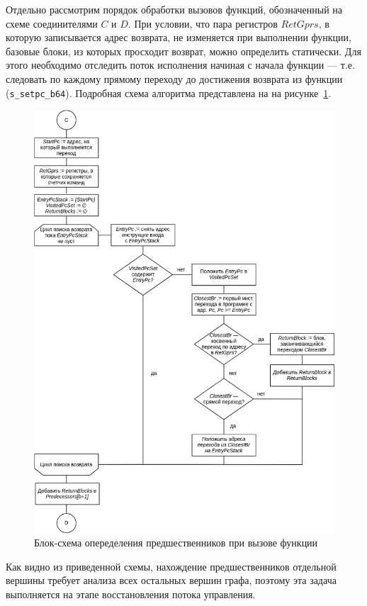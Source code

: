 \documentclass[a4paper,14pt]{extarticle}
\begin{document}
{Отдельно рассмотрим порядок обработки вызовов функций, обозначенный на схеме
соединителями $C$ и $D$. При условии, что пара регистров $RetGprs$, в которую
записывается адрес возврата, не изменяется при выполнении функции,
базовые блоки, из которых просходит возврат, можно определить статически.
Для этого необходимо отследить поток исполнения начиная с начала функции —
т.е. следовать по каждому прямому переходу до достижения возврата из функции
(\verb|s_setpc_b64|). Подробная схема алгоритма представлена на
на рисунке~\ref{fig:diagram-cfg-call}.

\begin{figure}[H]
\centering
\includegraphics[width=\textwidth]{diagrams/alg-cfg-call}
\caption{Блок-схема опеределения предшественников при вызове функции}
\label{fig:diagram-cfg-call}
\end{figure}

Как видно из приведенной схемы, нахождение предшественников отдельной вершины
требует анализа всех остальных вершин графа, поэтому эта задача выполняется
на этапе восстановления потока управления.

}
\end{document}
